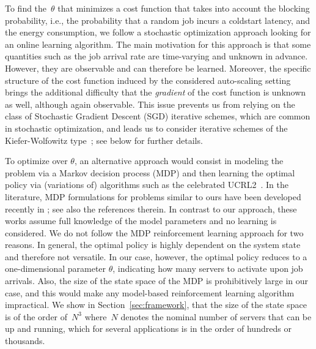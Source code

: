 To find the~$\theta$ that minimizes a cost function that takes into account the blocking probability, i.e., the probability that a random job incurs a coldstart latency, and the energy consumption, we follow a stochastic optimization approach looking for an online learning algorithm.
The main motivation for this approach is that some quantities such as the job arrival rate are time-varying and unknown in advance. However, they are observable and can therefore be learned.
Moreover, the specific structure of the cost function induced by the considered auto-scaling setting brings the additional difficulty that the \emph{gradient} of the cost function is unknown as well, although again observable.
This issue prevents us from relying on the class of Stochastic Gradient Descent (SGD) iterative schemes, which are common in stochastic optimization, and leads us to consider iterative schemes of the Kiefer-Wolfowitz type~\cite{borkar2008stochastic}; see below for further details.

To optimize over $\theta$, an alternative approach would consist in modeling the problem via a Markov decision process (MDP) \cite{Puterman94} and then learning the optimal policy via (variations of) algorithms such as the celebrated UCRL2~\cite{UCRL2}.
In the literature, MDP formulations for problems similar to ours have been developed recently in \cite{IEEE_TR_CS_2024,TournaireHyon2023}; see also the references therein.
In contrast to our approach, these works assume full knowledge of the model parameters and no learning is considered.
%
We do not follow the MDP reinforcement learning approach for two reasons.
In general, the optimal policy is highly dependent on the system state and therefore not versatile.
In our case, however, the optimal policy reduces to a one-dimensional parameter $\theta$, indicating how many servers to activate upon job arrivals. Also,  the size of the state space of the  MDP is prohibitively large  in our case, and this would make any model-based reinforcement learning algorithm impractical. We show in Section~\ref{sec:framework}, that the size of the state space is of the order of~$N^3$ where~$N$ denotes the nominal number of servers that can be up and running, which for several applications is in the order of hundreds or thousands.


